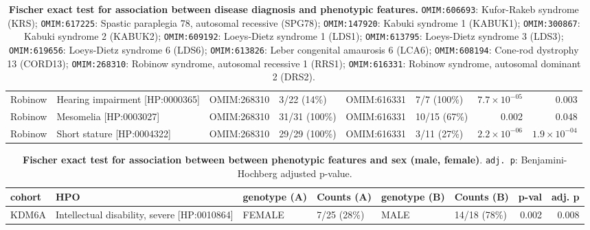 \begin{table}
\begin{scriptsize}
\begin{tabular}{l>{\raggedright}p{2.5cm}llllrr}
Robinow & Hearing impairment [HP:0000365] & OMIM:268310 & 3/22 (14\%) & OMIM:616331 & 7/7 (100\%) & $7.7 \times 10^{-05}$ & 0.003\\
Robinow & Mesomelia [HP:0003027] & OMIM:268310 & 31/31 (100\%) & OMIM:616331 & 10/15 (67\%) & 0.002 & 0.048\\
Robinow & Short stature [HP:0004322] & OMIM:268310 & 29/29 (100\%) & OMIM:616331 & 3/11 (27\%) & $2.2 \times 10^{-06}$ & $1.9 \times 10^{-04}$\\
\bottomrule
\end{tabular}
\end{scriptsize}
\caption{\textbf{Fischer exact test for association between disease diagnosis and phenotypic features.}
\texttt{OMIM:606693}: Kufor-Rakeb syndrome (KRS);
 \texttt{OMIM:617225}: Spastic paraplegia 78, autosomal recessive (SPG78);
 \texttt{OMIM:147920}: Kabuki syndrome 1 (KABUK1);
 \texttt{OMIM:300867}: Kabuki syndrome 2 (KABUK2);
 \texttt{OMIM:609192}: Loeys-Dietz syndrome 1 (LDS1);
 \texttt{OMIM:613795}:  Loeys-Dietz syndrome 3 (LDS3);
 \texttt{OMIM:619656}: Loeys-Dietz syndrome 6 (LDS6);
 \texttt{OMIM:613826}: Leber congenital amaurosis 6 (LCA6);
 \texttt{OMIM:608194}:  Cone-rod dystrophy 13 (CORD13);
 \texttt{OMIM:268310}: Robinow syndrome, autosomal recessive 1 (RRS1);
 \texttt{OMIM:616331}: Robinow syndrome, autosomal dominant 2 (DRS2).
}
\label{tab:disease_dx}
\end{table}



\clearpage
\newpage

\begin{table}
\centering
\begin{tabular}{l>{\raggedright}p{4cm}lp{2cm}lp{2.4cm}rr}
\toprule
\textbf{cohort} & \textbf{HPO} & \textbf{genotype (A)} & \textbf{Counts (A)} & \textbf{genotype (B)} & \textbf{Counts (B)} & \textbf{p-val} & \textbf{adj. p}\\
\midrule
KDM6A & Intellectual disability, severe [HP:0010864] & FEMALE & 7/25 (28\%) & MALE & 14/18 (78\%) & 0.002 & 0.008\\
\bottomrule
\end{tabular}
\caption{\textbf{Fischer exact test for association between  between phenotypic features and sex (male, female)}. \texttt{adj. p}: Benjamini-Hochberg adjusted p-value.}
\label{tab:mf_hpo}
\end{table}

\clearpage
\newpage


